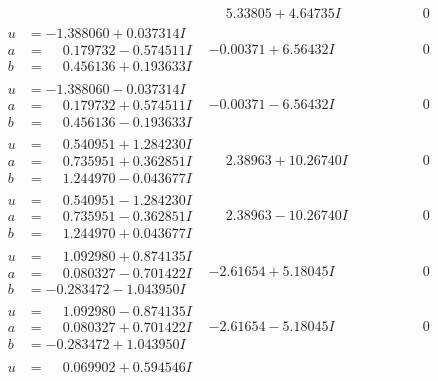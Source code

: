 \documentclass[1p]{elsarticle_modified}
\theoremstyle{definition}
\begin{document}
$$\begin{array}{c|c|c}
 & \phantom{-}5.33805 + 4.64735 I & \phantom{-0.000000 } 0 \\ \hline\begin{aligned}
u &= -1.388060 + 0.037314 I \\
a &= \phantom{-}0.179732 - 0.574511 I \\
b &= \phantom{-}0.456136 + 0.193633 I\end{aligned}
 & -0.00371 + 6.56432 I & \phantom{-0.000000 } 0 \\ \hline\begin{aligned}
u &= -1.388060 - 0.037314 I \\
a &= \phantom{-}0.179732 + 0.574511 I \\
b &= \phantom{-}0.456136 - 0.193633 I\end{aligned}
 & -0.00371 - 6.56432 I & \phantom{-0.000000 } 0 \\ \hline\begin{aligned}
u &= \phantom{-}0.540951 + 1.284230 I \\
a &= \phantom{-}0.735951 + 0.362851 I \\
b &= \phantom{-}1.244970 - 0.043677 I\end{aligned}
 & \phantom{-}2.38963 + 10.26740 I & \phantom{-0.000000 } 0 \\ \hline\begin{aligned}
u &= \phantom{-}0.540951 - 1.284230 I \\
a &= \phantom{-}0.735951 - 0.362851 I \\
b &= \phantom{-}1.244970 + 0.043677 I\end{aligned}
 & \phantom{-}2.38963 - 10.26740 I & \phantom{-0.000000 } 0 \\ \hline\begin{aligned}
u &= \phantom{-}1.092980 + 0.874135 I \\
a &= \phantom{-}0.080327 - 0.701422 I \\
b &= -0.283472 - 1.043950 I\end{aligned}
 & -2.61654 + 5.18045 I & \phantom{-0.000000 } 0 \\ \hline\begin{aligned}
u &= \phantom{-}1.092980 - 0.874135 I \\
a &= \phantom{-}0.080327 + 0.701422 I \\
b &= -0.283472 + 1.043950 I\end{aligned}
 & -2.61654 - 5.18045 I & \phantom{-0.000000 } 0 \\ \hline\begin{aligned}
u &= \phantom{-}0.069902 + 0.594546 I \\

\end{aligned}
\end{array}$$
\end{document}
